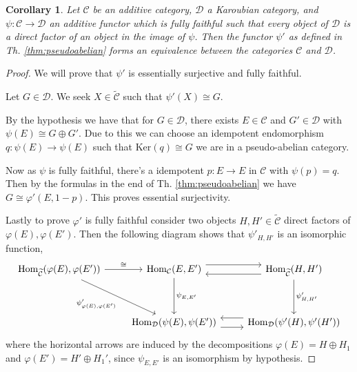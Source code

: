 \documentclass[12pt]{article}
\numberwithin{equation}{section}
\newcommand{\Hom}{{\mathrm{Hom}}}
\newcounter{dummy} \numberwithin{dummy}{section}
\newtheorem{corollary}[dummy]{Corollary}
\begin{document}
	\begin{corollary}\label{thm:equivpseudoabelian}
		Let $\mathcal{C}$ be an additive category, $\mathcal{D}$ a Karoubian category, and $\psi: \mathcal{C} \to \mathcal{D}$ an additive functor which is fully faithful such that every object of $\mathcal{D}$ is a direct factor of an object in the image of $\psi$. Then the functor $\psi'$ as defined in Th. \ref{thm:pseudoabelian} forms an equivalence between the categories $\mathcal{C}$ and $\mathcal{D}$.
	\end{corollary}
	\begin{proof}
		We will prove that $\psi'$ is essentially surjective and fully faithful. 
		
		Let $G \in \mathcal{D}$. We seek $X \in \widetilde{\mathcal{C}}$ such that $\psi'(X) \cong G$.
		
		By the hypothesis we have that for $G \in \mathcal{D}$, there exists $E \in \mathcal{C}$ and $G' \in \mathcal{D}$ with $\psi(E) \cong G \oplus G'$.
		Due to this we can choose an idempotent endomorphism $q: \psi(E) \to \psi(E)$ such that $\text{Ker}(q) \cong G$ we are in a pseudo-abelian category.
		
		Now as $\psi$ is fully faithful, there's a idempotent $p: E \to E$ in $\mathcal{C}$ with $\psi(p) = q$. Then by the formulas in the end of Th. \ref{thm:pseudoabelian} we have $G \cong \varphi' (E,1-p).$ This proves essential surjectivity.
		
		Lastly to prove $\varphi'$ is fully faithful consider two objects $H, H' \in \widetilde{\mathcal{C}}$ direct factors of $\varphi(E), \varphi(E')$. Then the following diagram shows that $\psi'_{H,H'} $ is an isomorphic function,
		\[\begin{tikzcd}
			{\Hom_{\widetilde{\mathcal{C}}}( \varphi(E), \varphi(E'))} & {\Hom_{\mathcal{C} }(E,E')} & {\Hom_{\widetilde{\mathcal{C}}}(H,H')} \\
			\\
			& {\Hom_\mathcal{D} (\psi(E), \psi(E'))} & {\Hom_\mathcal{D}(\psi'(H), \psi'(H'))}
			\arrow["{\cong }", from=1-1, to=1-2]
			\arrow["{\psi'_{\varphi(E), \varphi(E')}}"', from=1-1, to=3-2]
			\arrow[shift left=2, from=1-2, to=1-3]
			\arrow["{\psi_{E,E'}}", from=1-2, to=3-2]
			\arrow[shift left=2, from=1-3, to=1-2]
			\arrow["{\psi'_{H,H'}}", from=1-3, to=3-3]
			\arrow[shift right=2, from=3-2, to=3-3]
			\arrow[shift right=2, from=3-3, to=3-2]
		\end{tikzcd}\]
		where the horizontal arrows are induced by the decompositions $\varphi(E)=H \oplus H_1$ and $\varphi(E')=H' \oplus H_1'$, since $\psi_{E,E'} $ is an isomorphism by hypothesis.
	\end{proof}
	
\end{document}
